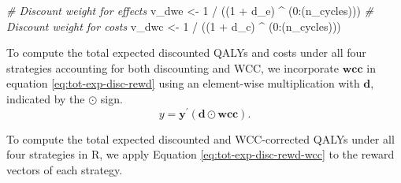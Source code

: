\documentclass[
]{article}
\newenvironment{Shaded}{\begin{snugshade}}{\end{snugshade}}
\newcommand{\CommentTok}[1]{\textcolor[rgb]{0.56,0.35,0.01}{\textit{#1}}}
\newcommand{\DecValTok}[1]{\textcolor[rgb]{0.00,0.00,0.81}{#1}}
\newcommand{\NormalTok}[1]{#1}
\newcommand{\OtherTok}[1]{\textcolor[rgb]{0.56,0.35,0.01}{#1}}
\newcommand{\SpecialCharTok}[1]{\textcolor[rgb]{0.00,0.00,0.00}{#1}}
\begin{document}
\begin{Shaded}
\begin{Highlighting}[]
\CommentTok{\# Discount weight for effects}
\NormalTok{v\_dwe }\OtherTok{\textless{}{-}} \DecValTok{1} \SpecialCharTok{/}\NormalTok{ ((}\DecValTok{1} \SpecialCharTok{+}\NormalTok{ d\_e) }\SpecialCharTok{\^{}}\NormalTok{ (}\DecValTok{0}\SpecialCharTok{:}\NormalTok{(n\_cycles)))  }
\CommentTok{\# Discount weight for costs }
\NormalTok{v\_dwc }\OtherTok{\textless{}{-}} \DecValTok{1} \SpecialCharTok{/}\NormalTok{ ((}\DecValTok{1} \SpecialCharTok{+}\NormalTok{ d\_c) }\SpecialCharTok{\^{}}\NormalTok{ (}\DecValTok{0}\SpecialCharTok{:}\NormalTok{(n\_cycles)))    }
\end{Highlighting}
\end{Shaded}

To compute the total expected discounted QALYs and costs under all four strategies accounting for both discounting and WCC, we incorporate \(\mathbf{wcc}\) in equation \eqref{eq:tot-exp-disc-rewd} using an element-wise multiplication with \(\mathbf{d}\), indicated by the \(\odot\) sign.
\begin{equation}
 y = \mathbf{y}^{'} \left(\mathbf{d} \odot \mathbf{wcc}\right).
 \label{eq:tot-exp-disc-rewd-wcc}
\end{equation}

To compute the total expected discounted and WCC-corrected QALYs under all four strategies in R, we apply Equation \eqref{eq:tot-exp-disc-rewd-wcc} to the reward vectors of each strategy.
\end{document}
